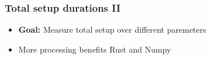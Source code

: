 \documentclass[t,english]{beamer}
\begin{document}
\begin{frame}
    \frametitle{Total setup durations II}
        \begin{itemize}
        \item \textbf{Goal:} Measure total setup over different paremeters
        \end{itemize}
    \begin{itemize}
        \item<2->  More processing benefits Rust and Numpy
    \end{itemize}
\end{frame}
\end{document}
